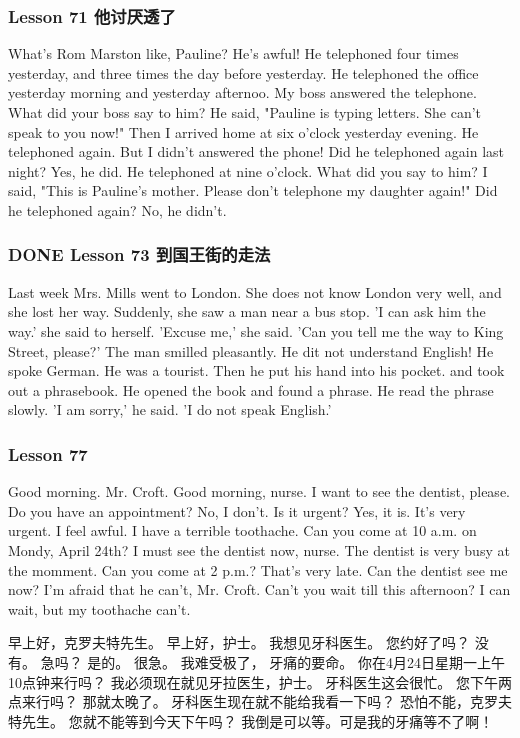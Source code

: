 \documentclass[11pt]{ctexart}
\begin{document}
\subsubsection{Lesson 71 他讨厌透了}
\label{sec:orgcc96980}
What's Rom Marston like, Pauline?
He's awful!
He telephoned four times yesterday,
and three times the day before yesterday.
He telephoned the office yesterday morning and yesterday afternoo.
My boss answered the telephone.
What did your boss say to him?
He said, "Pauline is typing letters. She can't speak to you now!"
Then I arrived home at six o'clock yesterday evening.
He telephoned again.
But I didn't answered the phone!
Did he telephoned again last night?
Yes, he did.
He telephoned at nine o'clock.
What did you say to him?
I said, "This is Pauline's mother.
Please don't telephone my daughter again!"
Did he telephoned again?
No, he didn't.
\subsubsection{{\bfseries\sffamily DONE} Lesson 73 到国王街的走法}
\label{sec:orga270be9}
Last week Mrs. Mills went to London.
She does not know London very well, and she lost her way.
Suddenly, she saw a man near a bus stop.
'I can ask him the way.' she said to herself.
'Excuse me,' she said. 'Can you tell me the way to King Street, please?'
The man smilled pleasantly.
He dit not understand English!
He spoke German.
He was a tourist.
Then he put his hand into his pocket.
and took out a phrasebook.
He opened the book and found a phrase.
He read the phrase slowly.
'I am sorry,' he said. 'I do not speak English.'
\subsubsection{Lesson 77}
\label{sec:orgcc396e2}
Good morning. Mr. Croft.
Good morning, nurse.
I want to see the dentist, please.
Do you have an appointment?
No, I don't.
Is it urgent?
Yes, it is.
It's very urgent.
I feel awful.
I have a terrible toothache.
Can you come at 10 a.m. on Mondy, April 24th?
I must see the dentist now, nurse.
The dentist is very busy at the momment.
Can you come at 2 p.m.?
That's very late.
Can the dentist see me now?
I'm afraid that he can't, Mr. Croft.
Can't you wait till this afternoon?
I can wait, but my toothache can't.

早上好，克罗夫特先生。
早上好，护士。
我想见牙科医生。
您约好了吗？
没有。
急吗？
是的。
很急。
我难受极了，
牙痛的要命。
你在4月24日星期一上午10点钟来行吗？
我必须现在就见牙拉医生，护士。
牙科医生这会很忙。
您下午两点来行吗？
那就太晚了。
牙科医生现在就不能给我看一下吗？
恐怕不能，克罗夫特先生。
您就不能等到今天下午吗？
我倒是可以等。可是我的牙痛等不了啊！
\end{document}
